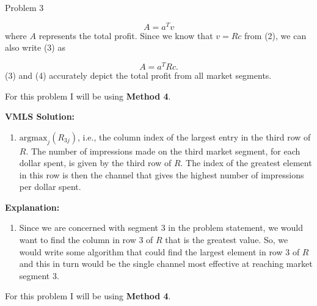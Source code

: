 \begin{problem}{Problem 3}
\begin{highlight}
\begin{enumerate}[label = (\alph*), start = 3]
            \begin{equation}
                A = a^{T}v
            \end{equation}
            where $A$ represents the total profit. Since we know that $v = Rc$ from (2), we can also write (3) as

            \begin{equation}
                A = a^{T}Rc.
            \end{equation}
            (3) and (4) accurately depict the total profit from all market segments.
        \end{enumerate}
    \end{highlight}

    \begin{highlight}
        For this problem I will be using \textbf{Method 4}. \vspace*{1em}

        \noindent \textbf{VMLS Solution:}

        \begin{enumerate}[label = (\alph*), start = 4]
            \item $\text{argmax}_{j}(R_{3j})$, i.e., the column index of the largest entry in the third row of $R$. The number of impressions made on the third market segment, for each dollar spent, is
            given by the third row of $R$. The index of the greatest element in this row is then the channel that gives the highest number of impressions per dollar spent.
        \end{enumerate}

        \noindent \textbf{Explanation:}

        \begin{enumerate}[label = (\alph*), start = 4]
            \item Since we are concerned with segment 3 in the problem statement, we would want to find the column in row 3 of $R$ that is the greatest value. So, we would write some algorithm that
            could find the largest element in row 3 of $R$ and this in turn would be the single channel most effective at reaching market segment 3.
        \end{enumerate}
    \end{highlight}

    \begin{highlight}
        For this problem I will be using \textbf{Method 4}. \vspace*{1em}


\end{highlight}
\end{problem}
